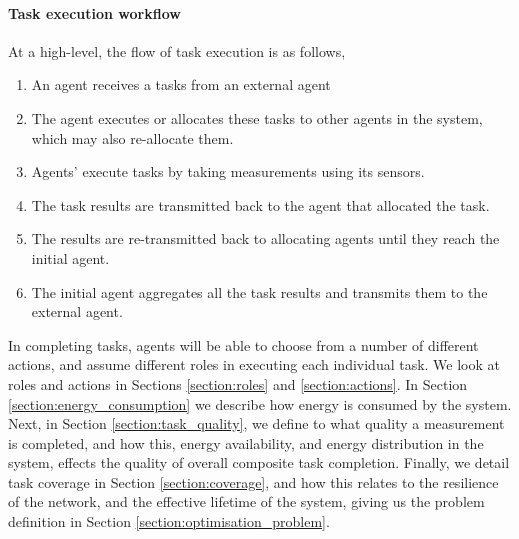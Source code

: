 \paragraph{Task execution workflow}
At a high-level, the flow of task execution is as follows,
\begin{enumerate}
	\item An agent receives a tasks from an external agent
	\item The agent executes or allocates these tasks to other agents in the system, which may also re-allocate them.
	\item Agents' execute tasks by taking measurements using its sensors.
	\item The task results are transmitted back to the agent that allocated the task.
	\item The results are re-transmitted back to allocating agents until they reach the initial agent.
	\item The initial agent aggregates all the task results and transmits them to the external agent.
\end{enumerate}
In completing tasks, agents will be able to choose from a number of different actions, and assume different roles in executing each individual task. We look at roles and actions in Sections \ref{section:roles} and \ref{section:actions}. In Section \ref{section:energy_consumption} we describe how energy is consumed by the system. Next, in Section \ref{section:task_quality}, we define to what quality a measurement is completed, and how this, energy availability, and energy distribution in the system, effects the quality of overall composite task completion. Finally, we detail task coverage in Section \ref{section:coverage}, and how this relates to the resilience of the network, and the effective lifetime of the system, giving us the problem definition in Section \ref{section:optimisation_problem}.

\begin{example}
\end{example}

